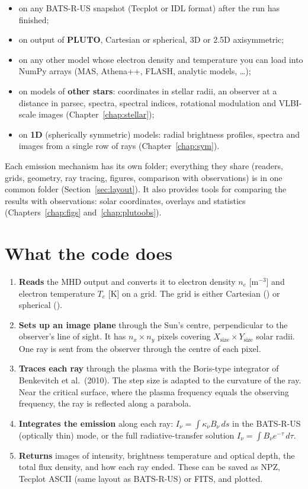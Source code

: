 \begin{itemize}[itemsep=1pt]
  \item on any BATS-R-US snapshot (Tecplot or IDL format) after the run has finished;
  \item on output of \textbf{PLUTO}, Cartesian or spherical, 3D or 2.5D axisymmetric;
  \item on any other model whose electron density and temperature you can load
        into NumPy arrays (MAS, Athena++, FLASH, analytic models, \ldots);
  \item on models of \textbf{other stars}: coordinates in stellar radii, an observer at a
        distance in parsec, spectra, spectral indices, rotational modulation and VLBI-scale
        images (Chapter~\ref{chap:stellar});
  \item on \textbf{1D} (spherically symmetric) models: radial brightness profiles, spectra
        and images from a single row of rays (Chapter~\ref{chap:sym}).
\end{itemize}

Each emission mechanism has its own folder; everything they share (readers, grids,
geometry, ray tracing, figures, comparison with observations) is in one common folder
(Section~\ref{sec:layout}). It also provides tools for comparing the results with observations: solar coordinates,
overlays and statistics (Chapters~\ref{chap:figs} and~\ref{chap:plutoobs}).

\section{What the code does}

\begin{enumerate}[itemsep=2pt]
  \item \textbf{Reads} the MHD output and converts it to electron density
        $n_e$ [m$^{-3}$] and electron temperature $T_e$ [K] on a grid. The grid is
        either Cartesian () or spherical ().
  \item \textbf{Sets up an image plane} through the Sun's centre, perpendicular to the
        observer's line of sight. It has $n_x\times n_y$ pixels covering
        $X_\text{size}\times Y_\text{size}$ solar radii. One ray is sent from the
        observer through the centre of each pixel.
  \item \textbf{Traces each ray} through the plasma with the Boris-type integrator
        of Benkevitch et al.\ (2010). The step size is adapted to the curvature of
        the ray. Near the critical surface, where the plasma frequency equals the
        observing frequency, the ray is reflected along a parabola.
  \item \textbf{Integrates the emission} along each ray:
        $I_\nu=\int\kappa_\nu B_\nu\,ds$ in the BATS-R-US (optically thin) mode, or
        the full radiative-transfer solution $I_\nu=\int B_\nu e^{-\tau}\,d\tau$.
  \item \textbf{Returns} images of intensity, brightness temperature and optical depth,
        the total flux density, and how each ray ended. These can be saved as
        NPZ, Tecplot ASCII (same layout as BATS-R-US) or FITS, and plotted.
\end{enumerate}

